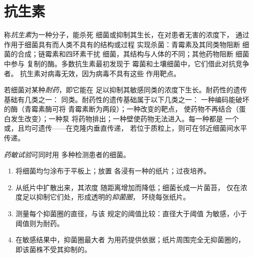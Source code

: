 \section{抗生素}

\begin{definition}[抗生素]\label{def:g11:antibiotic-resistance:antibiotic}
称\emph{抗生素}为一种分子，能杀死
细菌或抑制其生长，在对患者无害的浓度下，
通过作用于细菌具有而人类不具有的结构或过程
实现杀菌：青霉素及其同类物阻断
细菌的合成；链霉素和四环素干扰
细菌，其结构与人体的不同；其他药物阻断
细菌中参与  复制的酶。多数抗生素最初发现于
霉菌和土壤细菌中，它们借此对抗竞争者。
抗生素对病毒无效，因为病毒不具有这些
作用靶点。
\end{definition}

\begin{proposition}[耐药机制]\label{prop:g11:antibiotic-resistance:mechanisms}
若细菌对某种\emph{耐药}，即它能在
足以抑制其敏感同类的浓度下生长。耐药性的遗传基础有几类之一：
同类。耐药性的遗传基础属于以下几类之一：
一种编码能破坏的酶（青霉素酶可将
青霉素断为两段）；一种改变的靶点，
使药物不再结合（蛋白发生改变）；一种泵
将药物排出；一种壁使药物无法进入。每一种都是
一个或，且均可遗传——在克隆内垂直传递，
若位于质粒上，则可在邻近细菌间水平传递。
\end{proposition}
\admitted

\begin{method}[读取药敏试验结果]\label{met:g11:antibiotic-resistance:antibiogram}
\emph{药敏试验}可同时用
多种检测患者的细菌。
\begin{enumerate}
  \item 将细菌均匀涂布于平板上；放置
        各浸有一种的纸片；过夜培养。
  \item {}从纸片中扩散出来，其浓度
        随距离增加而降低；细菌长成一片菌苔，
        仅在浓度足以抑制它们处，形成透明的\emph{抑菌圈}，
        环绕每张纸片。
  \item 测量每个抑菌圈的直径，与该
        规定的阈值比较：直径大于阈值
        为敏感，小于阈值则为耐药。
  \item 在敏感结果中，抑菌圈最大者
        为用药提供依据；纸片周围完全无抑菌圈的，
        即该菌株不受其抑制的。
\end{enumerate}
\end{method}

